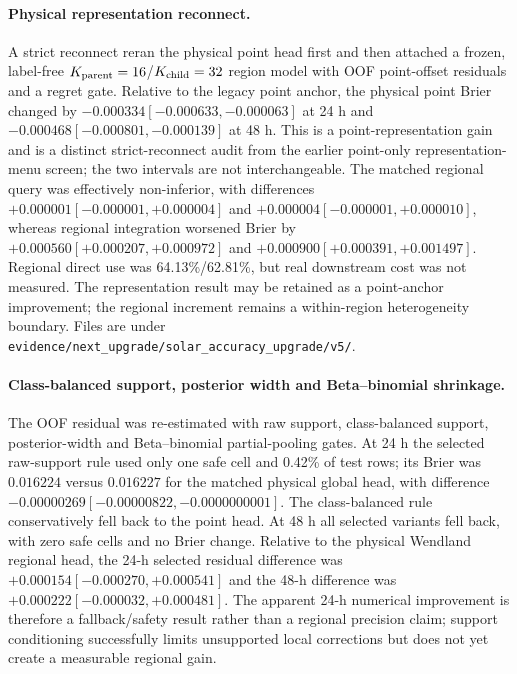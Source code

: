 \documentclass[11pt,a4paper]{article}
\numberwithin{equation}{section}
\theoremstyle{definition}\newtheorem{definition}[theorem]{Definition}
\theoremstyle{remark}\newtheorem{remark}[theorem]{Remark}
\begin{document}
\paragraph{Physical representation reconnect.}
A strict reconnect reran the physical point head first and then attached a frozen, label-free $K_{\rm parent}=16$/$K_{\rm child}=32$ region model with OOF point-offset residuals and a regret gate. Relative to the legacy point anchor, the physical point Brier changed by $-0.000334[-0.000633,-0.000063]$ at 24 h and $-0.000468[-0.000801,-0.000139]$ at 48 h. This is a point-representation gain and is a distinct strict-reconnect audit from the earlier point-only representation-menu screen; the two intervals are not interchangeable. The matched regional query was effectively non-inferior, with differences $+0.000001[-0.000001,+0.000004]$ and $+0.000004[-0.000001,+0.000010]$, whereas regional integration worsened Brier by $+0.000560[+0.000207,+0.000972]$ and $+0.000900[+0.000391,+0.001497]$. Regional direct use was 64.13\%/62.81\%, but real downstream cost was not measured. The representation result may be retained as a point-anchor improvement; the regional increment remains a within-region heterogeneity boundary. Files are under \texttt{evidence/next\_upgrade/solar\_accuracy\_upgrade/v5/}.

\paragraph{Class-balanced support, posterior width and Beta--binomial shrinkage.}
The OOF residual was re-estimated with raw support, class-balanced support, posterior-width and Beta--binomial partial-pooling gates. At 24 h the selected raw-support rule used only one safe cell and 0.42\% of test rows; its Brier was $0.016224$ versus $0.016227$ for the matched physical global head, with difference $-0.00000269[-0.00000822,-0.0000000001]$. The class-balanced rule conservatively fell back to the point head. At 48 h all selected variants fell back, with zero safe cells and no Brier change. Relative to the physical Wendland regional head, the 24-h selected residual difference was $+0.000154[-0.000270,+0.000541]$ and the 48-h difference was $+0.000222[-0.000032,+0.000481]$. The apparent 24-h numerical improvement is therefore a fallback/safety result rather than a regional precision claim; support conditioning successfully limits unsupported local corrections but does not yet create a measurable regional gain.
\end{document}

